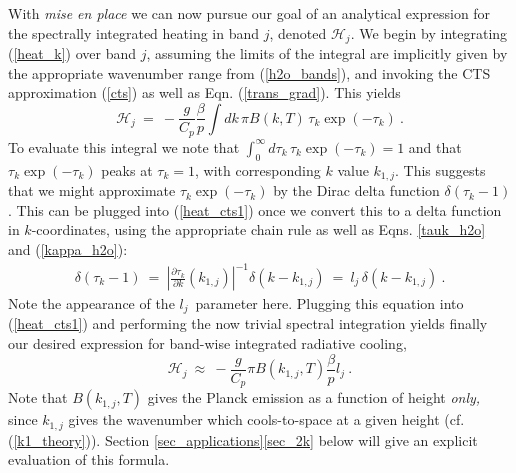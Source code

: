 \documentclass{ametsoc}
\newcommand{\beqn}{\begin{equation}}
\newcommand{\eeqn}{\end{equation}}
\newcommand{\eqnref}[1]{(\ref{#1})}
\newcommand{\inverse}{^{-1}}
\newcommand{\partialder}[2]{\ensuremath{\frac{\partial #1}{\partial #2}}}
\newcommand{\Cp}{\ensuremath{C_p}}
\newcommand{\ch}{\ensuremath{\mathcal{H}}}
\newcommand{\lj}{\ensuremath{l_j}}
\newcommand{\tauk}{\ensuremath{\tau_k}}
\newcommand{\konej}{\ensuremath{k_{1,j}}}
\begin{document}
With \emph{mise en place}  we can now pursue our goal of an analytical expression for the spectrally integrated heating in band $j$, denoted $\ch_j$. We begin by integrating \eqnref{heat_k} over band $j$, assuming the limits of the integral are implicitly given by  the appropriate wavenumber range from \eqnref{h2o_bands}, and invoking the CTS approximation \eqnref{cts} as well as Eqn.  \eqnref{trans_grad}. This yields
 \beqn
\ch_j \ =   \ -  \frac{g}{\Cp}\frac{\beta}{p}\int dk\,  \pi B(k,T)\, \tauk \exp(-\tauk) \ .
	\label{heat_cts1}
\eeqn
 To evaluate this integral we note that $\int_0^\infty d\tauk\,\tauk\exp(-\tauk)=1$ and that $\tauk\exp(-\tauk)$ peaks at $\tauk=1$, with corresponding $k$ value $\konej$. This suggests that we might approximate $\tauk\exp(-\tauk)$ by the Dirac delta function $\delta(\tauk -1)$. This can be plugged into \eqnref{heat_cts1} once we convert this to a delta function in $k$-coordinates, using the appropriate chain rule \citep[e.g.][]{gasiorowicz2003} as well as Eqns. \eqref{tauk_h2o} and \eqnref{kappa_h2o}:
    \begin{align*}
               \delta(\tau_k- 1) \ = \ \left|\partialder{\tau_k}{k}(\konej)\right|\inverse\!\!\delta(k-\konej) \ = \ \lj\,  \delta(k-\konej)  \ .
      \end{align*}
Note the appearance of the \lj\ parameter here. Plugging this equation into \eqnref{heat_cts1} and performing the now trivial spectral integration yields finally our desired expression for band-wise integrated radiative cooling,
\beqn
		\ch_j  \ \approx \ - \frac{g}{\Cp}\pi B(\konej,T)\frac{\beta}{p} \lj \ .
	\label{heat_cts3}
\eeqn
Note that $B(\konej,T)$ gives the Planck emission as a function of height \emph{only,} since $\konej$ gives the wavenumber which cools-to-space at a given height (cf. \eqnref{k1_theory}). Section \ref{sec_applications}\ref{sec_2k} below will give an explicit evaluation of this formula.

\end{document}
